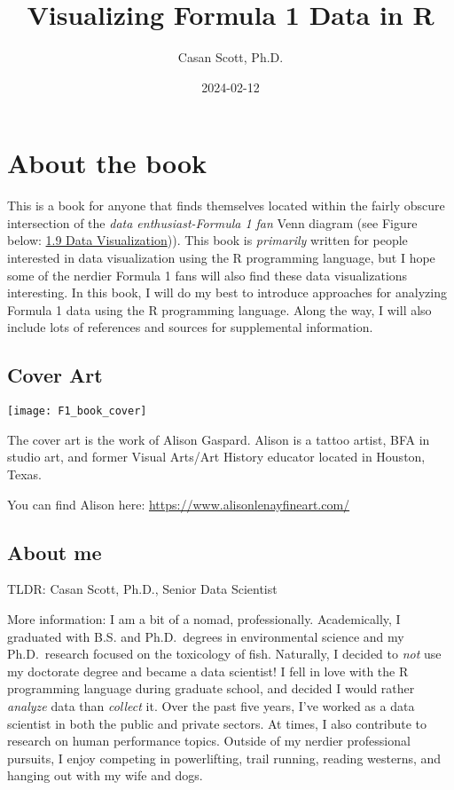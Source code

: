 \documentclass[
]{book}
\title{Visualizing Formula 1 Data in R}
\author{Casan Scott, Ph.D.}
\date{2024-02-12}
\begin{document}
\maketitle

{
\setcounter{tocdepth}{1}
\tableofcontents
}
\hypertarget{about-the-book}{%
\chapter{About the book}\label{about-the-book}}

This is a book for anyone that finds themselves located within the fairly obscure intersection of the \emph{data enthusiast-Formula 1 fan} Venn diagram (see Figure below: \protect\hyperlink{Dataux5cux2520Visualization}{1.9 Data Visualization})). This book is \emph{primarily} written for people interested in data visualization using the R programming language, but I hope some of the nerdier Formula 1 fans will also find these data visualizations interesting. In this book, I will do my best to introduce approaches for analyzing Formula 1 data using the R programming language. Along the way, I will also include lots of references and sources for supplemental information.

\newpage

\hypertarget{cover-art}{%
\section{Cover Art}\label{cover-art}}

\begin{center}\texttt{[image: F1\_book\_cover]} \end{center}

The cover art is the work of Alison Gaspard. Alison is a tattoo artist, BFA in studio art, and former Visual Arts/Art History educator located in Houston, Texas.

You can find Alison here: \url{https://www.alisonlenayfineart.com/}

\hypertarget{about-me}{%
\section{About me}\label{about-me}}

TLDR: Casan Scott, Ph.D., Senior Data Scientist

More information: I am a bit of a nomad, professionally. Academically, I graduated with B.S. and Ph.D.~degrees in environmental science and my Ph.D.~research focused on the toxicology of fish. Naturally, I decided to \emph{not} use my doctorate degree and became a data scientist! I fell in love with the R programming language during graduate school, and decided I would rather \emph{analyze} data than \emph{collect} it. Over the past five years, I've worked as a data scientist in both the public and private sectors. At times, I also contribute to research on human performance topics. Outside of my nerdier professional pursuits, I enjoy competing in powerlifting, trail running, reading westerns, and hanging out with my wife and dogs.
\end{document}
